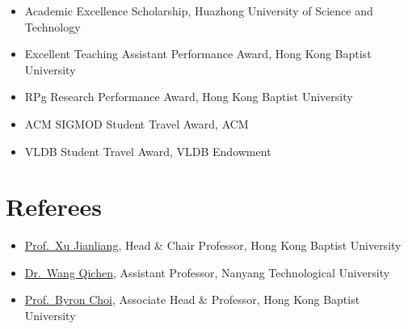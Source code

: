 \documentclass{mycv}
\begin{document}
\begin{itemize}
  \item Academic Excellence Scholarship, Huazhong University of Science and Technology 
  \item Excellent Teaching Assistant Performance Award, Hong Kong Baptist University 
  \item RPg Research Performance Award, Hong Kong Baptist University 
  \item ACM SIGMOD Student Travel Award, ACM 
  \item VLDB Student Travel Award, VLDB Endowment 
\end{itemize}

\section{Referees}
\begin{itemize}
  \item \href{https://www.comp.hkbu.edu.hk/~xujl}{Prof.~Xu Jianliang}, Head \& Chair Professor, Hong Kong Baptist University
  \item \href{https://qichen-wang.github.io}{Dr.~Wang Qichen}, Assistant Professor, Nanyang Technological University
  \item \href{https://www.comp.hkbu.edu.hk/~bchoi/}{Prof.~Byron Choi}, Associate Head \& Professor, Hong Kong Baptist University
\end{itemize}
\end{document}
